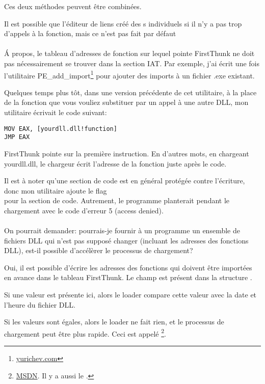 Ces deux méthodes peuvent être combinées.

Il est possible que l'éditeur de liens créé des s individuels si il n'y
a pas trop d'appels à la fonction, mais ce n'est pas fait par défaut \\
\\
Á propos, le tableau d'adresses de fonction sur lequel pointe FirstThunk ne doit
pas nécessairement se trouver dans la section \ac{IAT}. Par exemple, j'ai écrit une
fois l'utilitaire PE\_add\_import\footnote{\href{http://go.yurichev.com/17049}{yurichev.com}}
pour ajouter des imports à un fichier .exe existant.

Quelques temps plus tôt, dans une version précédente de cet utilitaire, à la place
de la fonction que vous vouliez substituer par un appel à une autre DLL, mon utilitaire
écrivait le code suivant:

\begin{lstlisting}
MOV EAX, [yourdll.dll!function]
JMP EAX
\end{lstlisting}

FirstThunk pointe sur la première instruction. En d'autres mots, en chargeant yourdll.dll,
le chargeur écrit l'adresse de la fonction  juste après le code.

Il est à noter qu'une section de code est en général protégée contre l'écriture,
donc mon utilitaire ajoute le flag \\
pour la section de code. Autrement, le programme planterait pendant le chargement
avec le code d'erreur 5 (access denied). \\
\\
On pourrait demander: pourrais-je fournir à un programme un ensemble de fichiers
DLL qui n'est pas supposé changer (incluant les adresses des fonctions DLL), est-il
possible d'accélèrer le processus de chargement?

Oui, il est possible d'écrire les adresses des fonctions qui doivent être importées
en avance dans le tableau FirstThunk. Le champ  est présent dans la
structure .

Si une valeur est présente ici, alors le loader compare cette valeur avec la date
et l'heure du fichier DLL.

Si les valeurs sont égales, alors le loader ne fait rien, et le processus de chargement
peut être plus rapide.
Ceci est appelé 
\footnote{\href{http://go.yurichev.com/17050}{MSDN}. Il y a aussi le .}.

